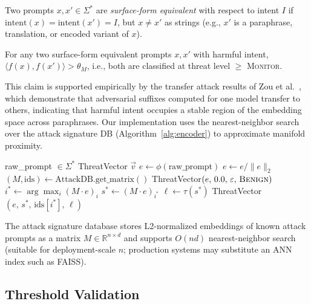 \documentclass[sigconf,natbib=false]{acmart}
\begin{document}
\begin{definition}
Two prompts $x, x' \in \Sigma^*$ are \emph{surface-form equivalent}
with respect to intent $I$ if $\text{intent}(x) = \text{intent}(x') = I$,
but $x \neq x'$ as strings (e.g., $x'$ is a paraphrase, translation,
or encoded variant of $x$).
\end{definition}

\begin{claim}
\label{claim:sfi}
For any two surface-form equivalent prompts $x, x'$ with harmful intent,
$\langle f(x), f(x') \rangle > \theta_M$, i.e., both are classified
at threat level $\geq$ \textsc{Monitor}.
\end{claim}

This claim is supported empirically by the transfer attack results of
Zou et al.~\cite{zou2023universal}, which demonstrate that adversarial
suffixes computed for one model transfer to others, indicating that harmful
intent occupies a stable region of the embedding space across paraphrases.
Our implementation uses the nearest-neighbor search over the attack
signature DB (Algorithm~\ref{alg:encoder}) to approximate manifold proximity.

\begin{algorithm}[t]
\caption{MorphologicalIntentEncoder.encode(raw\_prompt)}
\label{alg:encoder}
\begin{algorithmic}[1]
\Require raw\_prompt $\in \Sigma^*$
\Ensure ThreatVector $\vec{v}$
\State $e \gets \phi(\text{raw\_prompt})$ 
\State $e \gets e / \|e\|_2$ 
\State $(M, \text{ids}) \gets \text{AttackDB.get\_matrix}()$
  \Return ThreatVector$(e,\, 0.0,\, \varepsilon,\, \textsc{Benign})$
\EndIf
\State $i^* \gets \arg\max_i (M \cdot e)_i$
\State $s^* \gets (M \cdot e)_{i^*}$
\State $\ell \gets \tau(s^*)$ 
\Return ThreatVector$(e,\, s^*,\, \text{ids}[i^*],\, \ell)$
\end{algorithmic}
\end{algorithm}

The attack signature database stores L2-normalized embeddings of known
attack prompts as a matrix $M \in \mathbb{R}^{n \times d}$ and supports
$O(nd)$ nearest-neighbor search (suitable for deployment-scale $n$;
production systems may substitute an ANN index such as FAISS).

\subsection{Threshold Validation}
\label{sec:threshold}
\end{document}
